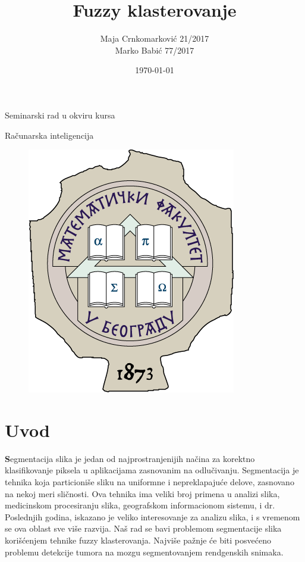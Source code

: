\documentclass{article}
\begin{document}
\selectfont

\title{{\huge {\selectfont Fuzzy} klasterovanje}}

\author{Maja Crnkomarkovi\'{c} 21/2017\\Marko Babi\'{c} 77/2017}
\date{\today}

\maketitle

\centerline{{\normalsize Seminarski rad u okviru kursa}}
\centerline{{\normalsize Ra\v{c}unarska inteligencija}}

\begin{figure}[h]
\vspace{1cm}
\centerline{\includegraphics[scale=0.5]{images/grb.png}}
\end{figure}

\newpage

\renewcommand*\contentsname{\fontencoding{OT2}\selectfont Sadr\v{z}aj}

\tableofcontents

\newpage

\section{\selectfont Uvod}
\textbf Segmentacija slika je jedan od najprostranjenijih na\v{c}ina za korektno klasifikovanje piksela u aplikacijama zasnovanim na odlu\v{c}ivanju. Segmentacija je tehnika koja particioni\v{s}e sliku na uniformne i nepreklapaju\'{c}e delove, zasnovano na nekoj meri sli\v{c}nosti. Ova tehnika ima veliki broj primena u analizi slika, medicinskom procesiranju slika, geografskom informacionom sistemu, i dr. Poslednjih godina, iskazano je veliko interesovanje za analizu slika, i s vremenom se ova oblast sve vi\v{s}e razvija. Na\v{s} rad se bavi problemom segmentacije slika kori\v{s}\'{c}enjem tehnike {\selectfont fuzzy} klasterovanja. Najvi\v{s}e pa\v{z}nje \'{c}e biti posve\'{c}eno problemu detekcije tumora na mozgu segmentovanjem rendgenskih snimaka.
\end{document}

